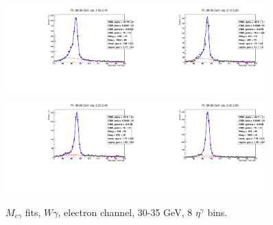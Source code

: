 \begin{figure}[htb]
\begin{center}
   \includegraphics[width=0.45\textwidth]{../figs/figs_v11/ELECTRON_WGamma/EtoGammaFits/sa_hZmass_h_Data_EtoGamma_Enr_ENDCAP_pt30to35_ieta0.pdf}\includegraphics[width=0.45\textwidth]{../figs/figs_v11/ELECTRON_WGamma/EtoGammaFits/sa_hZmass_h_Data_EtoGamma_Enr_ENDCAP_pt30to35_ieta1.pdf}\\
   \includegraphics[width=0.45\textwidth]{../figs/figs_v11/ELECTRON_WGamma/EtoGammaFits/sa_hZmass_h_Data_EtoGamma_Enr_ENDCAP_pt30to35_ieta2.pdf}\includegraphics[width=0.45\textwidth]{../figs/figs_v11/ELECTRON_WGamma/EtoGammaFits/sa_hZmass_h_Data_EtoGamma_Enr_ENDCAP_pt30to35_ieta3.pdf}\\
  \label{fig:etogFits_30to35}
  \caption{$M_{e\gamma}$ fits, $W\gamma$, electron channel, 30-35 GeV, 8 $\eta^{\gamma}$ bins.}
  \end{center}
\end{figure}

